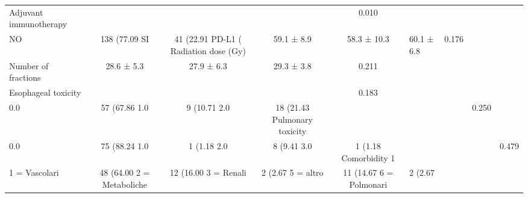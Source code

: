 \begin{table}[!ht]
\begin{tabular}{lcccc}
Adjuvant immunotherapy & & & & 0.010 \\
\hspace{3mm} NO & 138 (77.09%
\hspace{3mm} SI & 41 (22.91%
PD-L1 (%
Radiation dose (Gy) & 59.1 ± 8.9 & 58.3 ± 10.3 & 60.1 ± 6.8 & 0.176 \\
Number of fractions & 28.6 ± 5.3 & 27.9 ± 6.3 & 29.3 ± 3.8 & 0.211 \\
Esophageal toxicity & & & & 0.183 \\
\hspace{3mm} 0.0 & 57 (67.86%
\hspace{3mm} 1.0 & 9 (10.71%
\hspace{3mm} 2.0 & 18 (21.43%
Pulmonary toxicity & & & & 0.250 \\
\hspace{3mm} 0.0 & 75 (88.24%
\hspace{3mm} 1.0 & 1 (1.18%
\hspace{3mm} 2.0 & 8 (9.41%
\hspace{3mm} 3.0 & 1 (1.18%
Comorbidity 1 & & & & 0.479 \\
\hspace{3mm} 1 = Vascolari & 48 (64.00%
\hspace{3mm} 2 = Metaboliche & 12 (16.00%
\hspace{3mm} 3 = Renali & 2 (2.67%
\hspace{3mm} 5 = altro & 11 (14.67%
\hspace{3mm} 6 = Polmonari & 2 (2.67%

\end{tabular}
\end{table}
